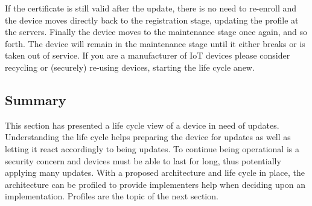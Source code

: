 \documentclass[0-thesis.tex]{subfiles}
\begin{document}
If the certificate is still valid after the update, there is no need to re-enroll and the
device moves directly back to the registration stage, updating the profile at the servers.
Finally the device moves to the maintenance stage once again, and so forth. The device
will remain in the maintenance stage until it either breaks or is taken out of service. If
you are a manufacturer of IoT devices please consider recycling or (securely) re-using
devices, starting the life cycle anew.

\subsection{Summary}
\label{ssec:life-cycle-summary}
This section has presented a life cycle view of a device in need of updates. Understanding
the life cycle helps preparing the device for updates as well as letting it react
accordingly to being updates. To continue being operational is a security concern and
devices must be able to last for long, thus potentially applying many updates. With a
proposed architecture and life cycle in place, the architecture can be profiled to provide
implementers help when deciding upon an implementation. Profiles are the topic of the next
section.
\end{document}
